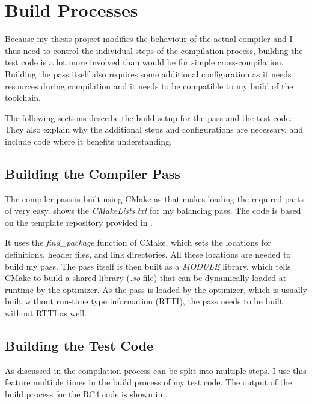 \section{Build Processes}
\label{build}
Because my thesis project modifies the behaviour of the actual compiler and I thus need to control the individual steps of the compilation process, building the test code is a lot more involved than would be for simple cross-compilation.
Building the pass itself also requires some additional configuration as it needs \llvm{} resources during compilation and it needs to be compatible to my build of the \llvm{} toolchain.

The following sections describe the build setup for the pass and the test code.
They also explain why the additional steps and configurations are necessary, and include code where it benefits understanding.

\subsection{Building the Compiler Pass}
\label{buildpass}
The compiler pass is built using CMake as that makes loading the required parts of \llvm{} very easy.
 shows the \emph{CMakeLists.txt} for my balancing pass.
The code is based on the template repository provided in \cite{sampson2015llvm}.



It uses the \emph{find\_package} function of CMake, which sets the locations for definitions, header files, and link directories.
All these locations are needed to build my pass.
The pass itself is then built as a \emph{MODULE} library, which tells CMake to build a shared library (\emph{.so} file) that can be dynamically loaded at runtime by the optimizer.
As the pass is loaded by the optimizer, which is usually built without run-time type information (RTTI), the pass needs to be built without RTTI as well.

\subsection{Building the Test Code}
\label{buildtest}
As discussed in  the \llvm{} compilation process can be split into multiple steps.
I use this feature multiple times in the build process of my test code.
The output of the build process for the RC4 code is shown in .

